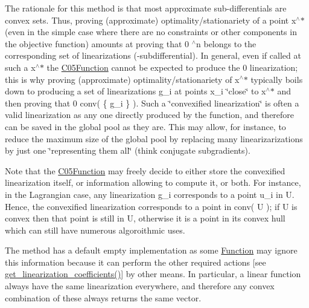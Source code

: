 The rationale for this method is that most approximate sub-\/differentials are convex sets. Thus, proving (approximate) optimality/stationariety of a point x$^\wedge$$\ast$ (even in the simple case where there are no constraints or other components in the objective function) amounts at proving that 0  $^\wedge$n belongs to the corresponding set of linearizations (-\/subdifferential). In general, even if called at such a x$^\wedge$$\ast$ the \mbox{\hyperlink{class_s_m_spp__di__unipi__it_1_1_c05_function}{C05\+Function}} cannot be expected to produce the 0 linearization; this is why proving (approximate) optimality/stationariety of x$^\wedge$$\ast$ typically boils down to producing a set of linearizations g\+\_\+i at points x\+\_\+i \char`\"{}close\char`\"{} to x$^\wedge$$\ast$ and then proving that 0  conv( \{ g\+\_\+i \} ). Such a \char`\"{}convexified
linearization\char`\"{} is often a valid linearization as any one directly produced by the function, and therefore can be saved in the global pool as they are. This may allow, for instance, to reduce the maximum size of the global pool by replacing many linearizarizations by just one \char`\"{}representing them all\char`\"{} (think conjugate subgradients).

Note that the \mbox{\hyperlink{class_s_m_spp__di__unipi__it_1_1_c05_function}{C05\+Function}} may freely decide to either store the convexified linearization itself, or information allowing to compute it, or both. For instance, in the Lagrangian case, any linearization g\+\_\+i corresponds to a point u\+\_\+i in U. Hence, the convexified linearization corresponds to a point in conv( U ); if U is convex then that point is still in U, otherwise it is a point in its convex hull which can still have numerous algoroithmic uses.

The method has a default empty implementation as some \mbox{\hyperlink{class_s_m_spp__di__unipi__it_1_1_function}{Function}} may ignore this information because it can perform the other required actions \mbox{[}see \mbox{\hyperlink{class_s_m_spp__di__unipi__it_1_1_c05_function_a6fa70047dc8b3d43a3ed44f1859a7239}{get\+\_\+linearization\+\_\+coefficients()}}\mbox{]} by other means. In particular, a linear function always have the same linearization everywhere, and therefore any convex combination of these always returns the same vector. \mbox{\label{class_s_m_spp__di__unipi__it_1_1_c05_function_ac477d0c3276fa28127d5aff69f31c367}} 
